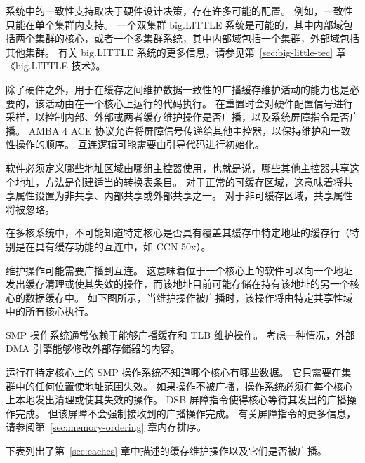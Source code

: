 系统中的一致性支持取决于硬件设计决策，存在许多可能的配置。
例如，一致性只能在单个集群内支持。
一个双集群 big.LITTLE 系统是可能的，其中内部域包括两个集群的核心，或者一个多集群系统，其中内部域包括一个集群，外部域包括其他集群。
有关 big.LITTLE 系统的更多信息，请参见第~\ref{sec:big-little-tec} 章《big.LITTLE 技术》。

除了硬件之外，用于在缓存之间维护数据一致性的广播缓存维护活动的能力也是必要的，该活动由在一个核心上运行的代码执行。
在重置时会对硬件配置信号进行采样，以控制内部、外部或两者缓存维护操作是否广播，以及系统屏障指令是否广播。
AMBA 4 ACE 协议允许将屏障信号传递给其他主控器，以保持维护和一致性操作的顺序。
互连逻辑可能需要由引导代码进行初始化。

软件必须定义哪些地址区域由哪组主控器使用，也就是说，哪些其他主控器共享这个地址，方法是创建适当的转换表条目。
对于正常的可缓存区域，这意味着将共享属性设置为非共享、内部共享或外部共享之一。
对于非可缓存区域，共享属性将被忽略。

在多核系统中，不可能知道特定核心是否具有覆盖其缓存中特定地址的缓存行（特别是在具有缓存功能的互连中，如 CCN-50x）。

维护操作可能需要广播到互连。
这意味着位于一个核心上的软件可以向一个地址发出缓存清理或使其失效的操作，而该地址目前可能存储在持有该地址的另一个核心的数据缓存中。
如下图所示，当维护操作被广播时，该操作将由特定共享性域中的所有核心执行。


SMP 操作系统通常依赖于能够广播缓存和 TLB 维护操作。
考虑一种情况，外部 DMA 引擎能够修改外部存储器的内容。

运行在特定核心上的 SMP 操作系统不知道哪个核心有哪些数据。
它只需要在集群中的任何位置使地址范围失效。
如果操作不被广播，操作系统必须在每个核心上本地发出清理或使其失效的操作。
DSB 屏障指令使得核心等待其发出的广播操作完成。
但该屏障不会强制接收到的广播操作完成。
有关屏障指令的更多信息，请参阅第~\ref{sec:memory-ordering} 章内存排序。

下表列出了第~\ref{sec:caches} 章中描述的缓存维护操作以及它们是否被广播。

